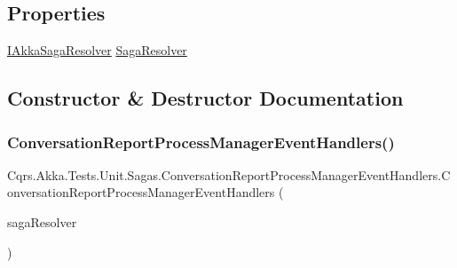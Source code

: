 \subsection*{Properties}
\begin{DoxyCompactItemize}
\item 
\hyperlink{interfaceCqrs_1_1Akka_1_1Domain_1_1IAkkaSagaResolver}{I\+Akka\+Saga\+Resolver} \hyperlink{classCqrs_1_1Akka_1_1Tests_1_1Unit_1_1Sagas_1_1ConversationReportProcessManagerEventHandlers_ab9316a7764bc962834f03fa32cd1fe28}{Saga\+Resolver}
\end{DoxyCompactItemize}


\subsection{Constructor \& Destructor Documentation}
\mbox{\label{classCqrs_1_1Akka_1_1Tests_1_1Unit_1_1Sagas_1_1ConversationReportProcessManagerEventHandlers_a0b35d652189d6194ff5893ff114293e0}} 
\subsubsection{\texorpdfstring{Conversation\+Report\+Process\+Manager\+Event\+Handlers()}{ConversationReportProcessManagerEventHandlers()}}
{\footnotesize\ttfamily Cqrs.\+Akka.\+Tests.\+Unit.\+Sagas.\+Conversation\+Report\+Process\+Manager\+Event\+Handlers.\+Conversation\+Report\+Process\+Manager\+Event\+Handlers (\begin{DoxyParamCaption}\item[{\hyperlink{interfaceCqrs_1_1Akka_1_1Domain_1_1IAkkaSagaResolver}{I\+Akka\+Saga\+Resolver}}]{saga\+Resolver }\end{DoxyParamCaption})}



